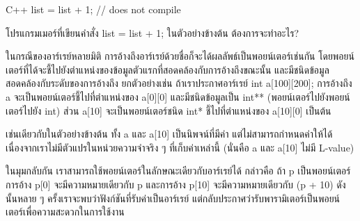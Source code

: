 \latintext
\begin{codelist}{C++}{}
  list = list + 1;              // does not compile
\end{codelist}
\thaitext

\begin{quiz}{}
โปรแกรมเมอร์{\wbr}ที่{\wbr}เขียน{\wbr}คำ{\wbr}สั่ง {\ct list = list + 1; }  ใน{\wbr}ตัวอย่าง{\wbr}ข้าง{\wbr}ต้น ต้องการ{\wbr}จะ{\wbr}ทำ{\wbr}อะไร?
\end{quiz}

ใน{\wbr}กรณี{\wbr}ของ{\wbr}อาร์{\wbr}เรย์{\wbr}หลาย{\wbr}มิติ การ{\wbr}อ้าง{\wbr}ถึง{\wbr}อาร์{\wbr}เรย์{\wbr}ด้วย{\wbr}ชื่อ{\wbr}ก็{\wbr}จะ{\wbr}ได้{\wbr}ผลลัพธ์{\wbr}เป็น{\wbr}พอยน์เตอร์{\wbr}เช่น{\wbr}กัน{\wbr}
โดย{\wbr}พอยน์เตอร์{\wbr}ที่{\wbr}ได้{\wbr}จะ{\wbr}ชี้{\wbr}ไป{\wbr}ยัง{\wbr}ตำแหน่ง{\wbr}ของ{\wbr}ข้อมูล{\wbr}ตัว{\wbr}แรก{\wbr}ที่{\wbr}สอดคล้อง{\wbr}กับ{\wbr}การ{\wbr}อ้าง{\wbr}ถึง{\wbr}ขณะ{\wbr}นั้น{\wbr}
และ{\wbr}มี{\wbr}ชนิด{\wbr}ข้อมูล{\wbr}สอดคล้อง{\wbr}กับ{\wbr}ระดับ{\wbr}ของ{\wbr}การ{\wbr}อ้าง{\wbr}ถึง ยก{\wbr}ตัวอย่าง{\wbr}เช่น ถ้า{\wbr}เรา{\wbr}ประกาศ{\wbr}อาร์{\wbr}เรย์ {\ct
  int a[100][200];} การ{\wbr}อ้าง{\wbr}ถึง {\ct a} จะ{\wbr}เป็น{\wbr}พอยน์เตอร์{\wbr}ชี้{\wbr}ไป{\wbr}ที่{\wbr}ตำแหน่ง{\wbr}ของ {\ct
  a[0][0]} และ{\wbr}มี{\wbr}ชนิด{\wbr}ข้อมูล{\wbr}เป็น {\ct int**} (พอยน์เตอร์ไป{\wbr}ยัง{\wbr}พอยน์เตอร์{\wbr}ไป{\wbr}ยัง {\ct
  int}) ส่วน {\ct a[10]} จะ{\wbr}เป็น{\wbr}พอยน์เตอร์{\wbr}ชนิด {\ct int*} ชี้{\wbr}ไป{\wbr}ที่{\wbr}ตำแหน่ง{\wbr}ของ {\ct
  a[10][0]} เป็นต้น{\wbr}

เช่น{\wbr}เดียว{\wbr}กับ{\wbr}ใน{\wbr}ตัวอย่าง{\wbr}ข้าง{\wbr}ต้น ทั้ง {\ct a} และ {\ct a[10]} เป็น{\wbr}นิพจน์{\wbr}ที่{\wbr}มี{\wbr}ค่า{\wbr}
แต่{\wbr}ไม่{\wbr}สามารถ{\wbr}กำหนด{\wbr}ค่า{\wbr}ให้{\wbr}ได้ เนื่อง{\wbr}จาก{\wbr}เรา{\wbr}ไม่{\wbr}มี{\wbr}ตัวแปร{\wbr}ใน{\wbr}หน่วย{\wbr}ความ{\wbr}จำ{\wbr}จริง ๆ ที่{\wbr}เก็บ{\wbr}ค่า{\wbr}เหล่า{\wbr}นี้{\wbr}
(นั่น{\wbr}คือ {\ct a} และ {\ct a[10]} ไม่{\wbr}มี L-value)

ใน{\wbr}มุมกลับ{\wbr}กัน เรา{\wbr}สามารถ{\wbr}ใช้{\wbr}พอยน์เตอร์{\wbr}ใน{\wbr}ลักษณะ{\wbr}เดียว{\wbr}กับ{\wbr}อาร์{\wbr}เรย์{\wbr}ได้ กล่าว{\wbr}คือ ถ้า {\ct p}
เป็น{\wbr}พอยน์เตอร์ การ{\wbr}อ้าง {\ct p[0]} จะ{\wbr}มี{\wbr}ความหมาย{\wbr}เดียว{\wbr}กับ {\ct *p} และ{\wbr}การ{\wbr}อ้าง{\wbr}
{\ct p[10]} จะ{\wbr}มี{\wbr}ความหมาย{\wbr}เดียว{\wbr}กับ {\ct *(p + 10)} ดังนั้น{\wbr}หลาย ๆ
ครั้ง{\wbr}เรา{\wbr}จะ{\wbr}พบ{\wbr}ว่า{\wbr}ฟังก์ชัน{\wbr}ที่{\wbr}รับ{\wbr}ค่า{\wbr}เป็น{\wbr}อาร์{\wbr}เรย์
แต่{\wbr}กลับ{\wbr}ประกาศ{\wbr}ว่า{\wbr}รับ{\wbr}พารามิเตอร์{\wbr}เป็น{\wbr}พอยน์เตอร์{\wbr}เพื่อ{\wbr}ความ{\wbr}สะดวก{\wbr}ใน{\wbr}การ{\wbr}ใช้งาน{\wbr}

